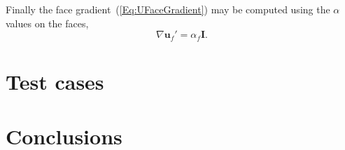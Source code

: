 \documentclass[final,3p,times,10pt,onecolumn]{myElsarticle}
\numberwithin{equation}{section}
\begin{document}
Finally the face gradient~(\ref{Eq:UFaceGradient}) may be computed using the $\alpha$ values on the faces,
\begin{equation}
\nabla \boldsymbol{u}_f'
=
\alpha_f
\boldsymbol{I}.
\end{equation}


\section{Test cases}
\label{sec:cases}

\section{Conclusions}
\label{sec:conclusions}



\end{document}
